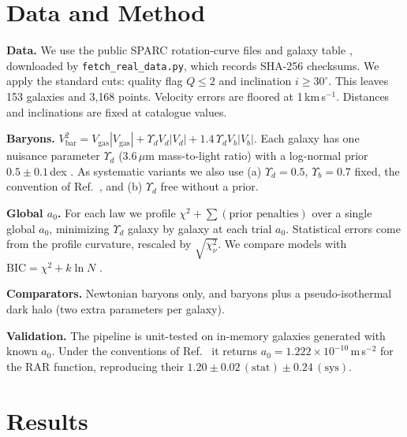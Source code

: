 \documentclass[11pt,a4paper]{article}
\begin{document}
\section{Data and Method}
\label{sec:method}
\textbf{Data.} We use the public SPARC rotation-curve files and galaxy table \cite{lelli2016sparc}, downloaded by \texttt{fetch\_real\_data.py}, which records SHA-256 checksums. We apply the standard cuts: quality flag $Q \le 2$ and inclination $i \ge 30^\circ$. This leaves 153 galaxies and 3{,}168 points. Velocity errors are floored at 1\,km\,s$^{-1}$. Distances and inclinations are fixed at catalogue values.

\textbf{Baryons.} $V_{\mathrm{bar}}^2 = V_{\mathrm{gas}}|V_{\mathrm{gas}}| + \Upsilon_d V_d|V_d| + 1.4\,\Upsilon_d V_b|V_b|$. Each galaxy has one nuisance parameter $\Upsilon_d$ (3.6\,$\mu$m mass-to-light ratio) with a log-normal prior $0.5 \pm 0.1$\,dex \cite{li2018}. As systematic variants we also use (a) $\Upsilon_d = 0.5$, $\Upsilon_b = 0.7$ fixed, the convention of Ref.~\cite{mcgaugh2016rar}, and (b) $\Upsilon_d$ free without a prior.

\textbf{Global $a_0$.} For each law we profile $\chi^2 + \sum(\text{prior penalties})$ over a single global $a_0$, minimizing $\Upsilon_d$ galaxy by galaxy at each trial $a_0$. Statistical errors come from the profile curvature, rescaled by $\sqrt{\chi^2_\nu}$. We compare models with $\mathrm{BIC} = \chi^2 + k\ln N$ \cite{schwarz1978bic}.

\textbf{Comparators.} Newtonian baryons only, and baryons plus a pseudo-isothermal dark halo (two extra parameters per galaxy).

\textbf{Validation.} The pipeline is unit-tested on in-memory galaxies generated with known $a_0$. Under the conventions of Ref.~\cite{mcgaugh2016rar} it returns $a_0 = 1.222\times10^{-10}$\,m\,s$^{-2}$ for the RAR function, reproducing their $1.20 \pm 0.02\,(\mathrm{stat}) \pm 0.24\,(\mathrm{sys})$.

\section{Results}
\label{sec:results}
\end{document}
